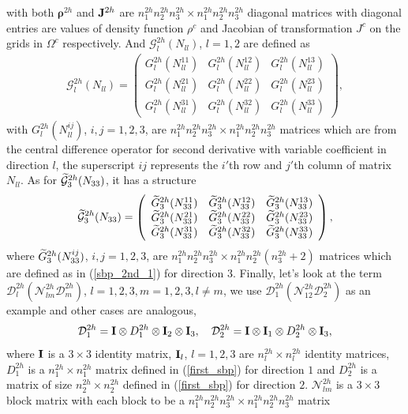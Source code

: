 with both ${\bm \rho}^{2h}$ and ${\bf J}^{2h}$ are $n_1^{2h}n_2^{2h}n_3^{2h}\times n_1^{2h}n_2^{2h}n_3^{2h}$ diagonal matrices with diagonal entries are values of density function $\rho^c$ and Jacobian of transformation $J^c$ on the grids in $\Omega^c$ respectively.
And $\mathcal{G}_l^{2h}({N}_{ll})$, $l=1,2$ are defined as
\begin{align}\label{g1122}
\mathcal{G}^{2h}_l({N}_{ll}) = \left(\begin{array}{ccc}
G_l^{2h}(N_{ll}^{11}) & G_l^{2h}(N_{ll}^{12})  & G_l^{2h}(N_{ll}^{13}) \\
G_l^{2h}(N_{ll}^{21}) & G_l^{2h}(N_{ll}^{22})  & G_l^{2h}(N_{ll}^{23}) \\
G_l^{2h}(N_{ll}^{31}) & G_l^{2h}(N_{ll}^{32})  & G_l^{2h}(N_{ll}^{33}) \end{array}\right),
\end{align}
with $G_l^{2h}(N_{ll}^{ij})$, $i,j = 1,2,3$, are $n_1^{2h}n_2^{2h}n_3^{2h}\times n_1^{2h}n_2^{2h}n_3^{2h}$ matrices which are from the central difference operator for second derivative with variable coefficient in direction $l$, the superscript $ij$ represents the $i'$th row and $j'$th column of matrix $N_{ll}$. As for $\widetilde{\mathcal{G}}_3^{2h}({N}_{33})$, it has a structure
\[ \widetilde{\mathcal{G}}^{2h}_3({N}_{33}) = \left(\begin{array}{ccc}
\widetilde{G}_3^{2h}(N_{33}^{11}) & \widetilde{G}_3^{2h}(N_{33}^{12})  & \widetilde{G}_3^{2h}(N_{33}^{13}) \\
\widetilde{G}_3^{2h}(N_{33}^{21}) & \widetilde{G}_3^{2h}(N_{33}^{22})  & \widetilde{G}_3^{2h}(N_{33}^{23}) \\
\widetilde{G}_3^{2h}(N_{33}^{31}) & \widetilde{G}_3^{2h}(N_{33}^{32})  & \widetilde{G}_3^{2h}(N_{33}^{33}) \end{array}\right),\]
where $\widetilde{G}_3^{2h}(N_{33}^{ij})$, $i,j = 1,2,3$, are $n_1^{2h}n_2^{2h}n_3^{2h}\times n_1^{2h}n_2^{2h}(n_3^{2h}+2)$ matrices which are defined as in (\ref{sbp_2nd_1}) for direction $3$. Finally, let's look at the term $\mathcal{D}_l^{2h}(\mathcal{N}_{lm}^{2h}\mathcal{D}_m^{2h})$, $l = 1,2,3, m = 1,2,3, l\neq m$, we use $\mathcal{D}_1^{2h}(\mathcal{N}_{12}^{2h}\mathcal{D}_2^{2h})$ as an example and other cases are analogous,
\[\mathcal{D}_1^{2h} = {\bf I}\otimes D_1^{2h} \otimes {\bf I}_2 \otimes {\bf I}_3,\ \ \ \mathcal{D}_2^{2h} ={\bf I}\otimes {\bf I}_1\otimes D_2^{2h}\otimes {\bf I}_3,\]
where ${\bf I}$ is a $3\times3$ identity matrix, ${\bf I}_l$, $l = 1,2,3$ are $n_l^{2h}\times n_l^{2h}$ identity matrices, $D_1^{2h}$ is a $n_1^{2h}\times n_1^{2h}$ matrix defined in (\ref{first_sbp}) for direction $1$ and $D_2^{2h}$ is a matrix of size $n_2^{2h}\times n_2^{2h}$ defined in (\ref{first_sbp}) for direction $2$. $\mathcal{N}_{lm}^{2h}$ is a $3\times3$ block matrix with each block to be a $n_1^{2h}n_2^{2h}n_3^{2h}\times n_1^{2h}n_2^{2h}n_3^{2h}$ matrix
